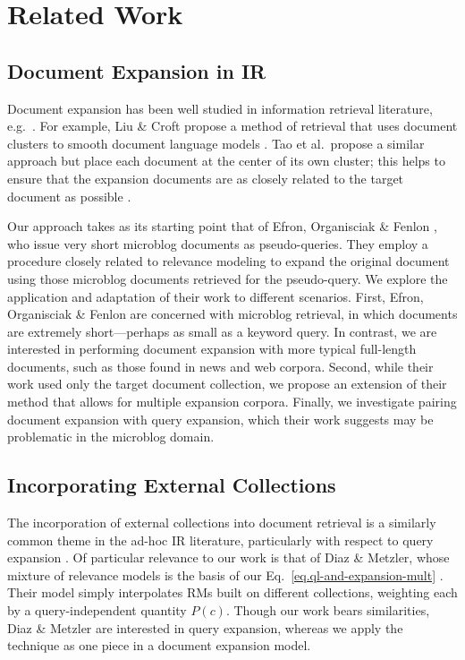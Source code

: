 \documentclass[sigconf]{acmart}
\begin{document}
\section{Related Work}\label{section.related}

\subsection{Document Expansion in IR}\label{section.related.ir}

Document expansion has been well studied in information retrieval literature, e.g.\ \cite{Liu2004, Singhal1999, Tao2006, Wei2006}. For example, Liu \& Croft propose a method of retrieval that uses document clusters to smooth document language models \cite{Liu2004}. Tao et al.\ propose a similar approach but place each document at the center of its own cluster; this helps to ensure that the expansion documents are as closely related to the target document as possible \cite{Tao2006}.

Our approach takes as its starting point that of Efron, Organisciak \& Fenlon \cite{Efron2012}, who issue very short microblog documents as pseudo-queries. They employ a procedure closely related to relevance modeling \cite{Lavrenko2001} to expand the original document using those microblog documents retrieved for the pseudo-query. We explore the application and adaptation of their work to different scenarios. First, Efron, Organisciak \& Fenlon are concerned with microblog retrieval, in which documents are extremely short---perhaps as small as a keyword query. In contrast, we are interested in performing document expansion with more typical full-length documents, such as those found in news and web corpora. Second, while their work used only the target document collection, we propose an extension of their method that allows for multiple expansion corpora. Finally, we investigate pairing document expansion with query expansion, which their work suggests may be problematic in the microblog domain.

\subsection{Incorporating External Collections}\label{section.external.collections}

The incorporation of external collections into document retrieval is a similarly common theme in the ad-hoc IR literature, particularly with respect to query expansion \cite{Bendersky2012, Diaz2006, Li2007, Weerkamp2009, Xu2009}. Of particular relevance to our work is that of Diaz \& Metzler, whose mixture of relevance models is the basis of our Eq.~\ref{eq.ql-and-expansion-mult} \cite{Diaz2006}. Their model simply interpolates RMs built on different collections, weighting each by a query-independent quantity $P(c)$. Though our work bears similarities, Diaz \& Metzler are interested in query expansion, whereas we apply the technique as one piece in a document expansion model.
\end{document}
